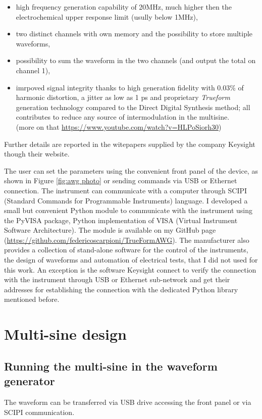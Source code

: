 \begin{itemize}
    \item high frequency generation capability of 20MHz, much higher then the electrochemical upper response limit (usully below 1MHz),
    \item two distinct channels with own memory and the possibility to store multiple waveforms,
    \item possibility to sum the waveform in the two channels (and output the total on channel 1),
    \item imrpoved signal integrity thanks to high generation fidelity with 0.03\% of harmonic distortion, a jitter as low as 1 ps and proprietary \emph{Trueform} generation technology compared to the Direct Digital Synthesis method; all contributes to reduce any source of intermodulation in the multisine. \\ (more on that \url{https://www.youtube.com/watch?v=HLPoSiorh30})
\end{itemize}
Further details are reported in the witepapers supplied by the company Keysight though their website.

The user can set the parameters using the convenient front panel of the device, as shown in Figure \ref{fig:awg photo} or sending commands via USB or Ethernet connection. The instrument can communicate with a computer through SCIPI (Standard Commands for Programmable Instruments) language. I developed a small but convenient Python module to communicate with the instrument using the PyVISA package, Python implementation of VISA (Virtual Instrument Software Architecture). The module is available on my GitHub page (\url{https://github.com/federicoscarpioni/TrueFormAWG}). The manufacturer also provides a collection of stand-alone software for the control of the instruments, the design of  waveforms and automation of electrical tests, that I did not used for this work. An exception is the software Keysight connect to verify the connection with the instrument through USB or Ethernet sub-network and get their addresses for establishing the connection with the dedicated Python library mentioned before.

\section{Multi-sine design}

\subsection{Running the multi-sine in the waveform generator}
The waveform can be transferred via USB drive accessing the front panel or via SCIPI communication.


